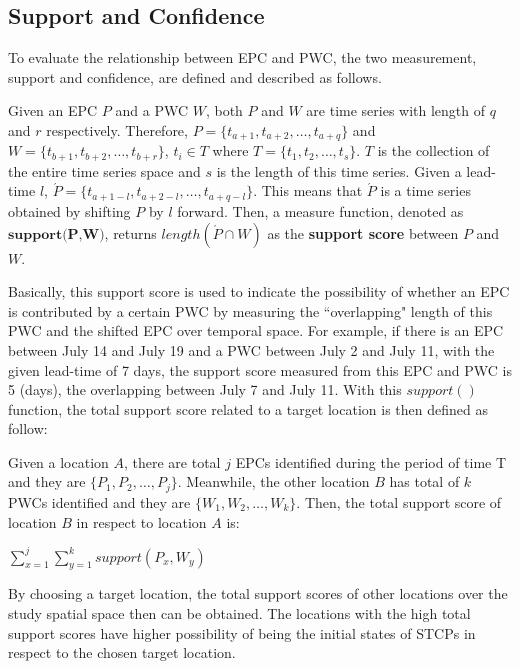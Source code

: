 \documentclass{acm_proc_article-sp}
\begin{document}
\subsection{Support and Confidence}
\label{sec:support}
To evaluate the relationship between EPC and PWC, the two measurement, support and confidence, are defined and described as follows.  
\begin{mydef}
\label{def:suportfunction}
Given an EPC $P$ and a PWC $W$, both $P$ and $W$ are time series with length of $q$ and $r$ respectively. Therefore, $P = \{ t_{a+1}, t_{a+2}, \ldots , t_{a+q} \} $ and $W = \{ t_{b+1}, t_{b+2}, \ldots , t_{b+r} \}$,  $t_i \in T$ where $T = \{ t_1, t_2, \ldots , t_s \} $. $T$ is the collection of the entire time series space and $s$ is the length of this time series.
\newline 
Given a lead-time $l$, $\acute{P} = \{ t_{a+1-l}, t_{a+2-l}, \ldots , t_{a+q-l} \} $. This means that $\acute{P}$ is a time series obtained by shifting $P$ by $l$ forward. Then, a measure function, denoted as $\textbf{support(P,W)}$, returns $length(\acute{P} \cap W)$ as the \textbf{support score} between $P$ and $W$.
\end{mydef} 
Basically, this support score is used to indicate the possibility of whether an EPC is contributed by a certain PWC by measuring the ``overlapping" length of this PWC and the shifted EPC over temporal space. For example, if there is an EPC between July 14 and July 19 and a PWC between July 2 and July 11, with the given lead-time of 7 days, the support score measured from this EPC and PWC is 5 (days), the overlapping between July 7 and July 11.
\newline
With this $support()$ function, the total support score related to a target location is then defined as follow:
\begin{mydef}
\label{def:totalsuport}
Given a location $A$, there are total $j$ EPCs identified during the period of time T and they are $\{ P_1 , P_2 , \ldots , P_j \}$. Meanwhile, the other location $B$ has total of $k$ PWCs identified and they are $\{ W_1 , W_2 , \ldots , W_k \}$. Then, the total support score of location $B$ in respect to location $A$ is: 
\begin{center}
    $\sum_{x=1}^{j} \sum_{y=1}^{k} support(P_x,W_y) $
\end{center}
\end{mydef}
By choosing a target location, the total support scores of other locations over the study spatial space then can be obtained. The locations with the high total support scores have higher possibility of being the initial states of STCPs in respect to the chosen target location. 
\end{document}
